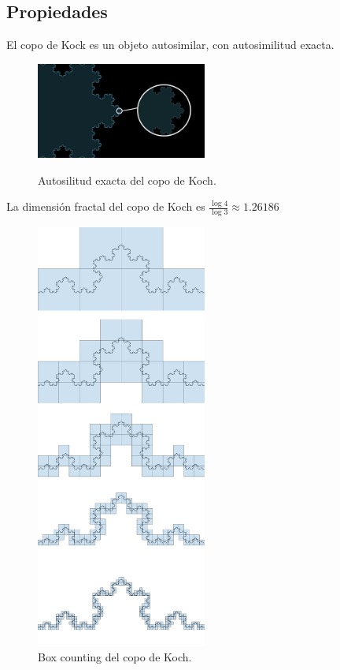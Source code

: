 \subsection{Propiedades}

\noindent El copo de Kock es un objeto autosimilar, con autosimilitud exacta. \cite{youtube-2022}

\begin{figure}[H]
\centering
\includegraphics[width=0.5\textwidth]{figures/kock-snowflake-self-similarity.jpg}
\caption{Autosilitud exacta del copo de Koch.}
\label{fig:koch-snowflake-self-similarity}
\cite{youtube-2022}
\end{figure}

\noindent La dimensión fractal del copo de Koch es $\frac{\log 4}{\log 3} \approx 1.26186$ \cite{eswiki:copo-koch}\\

\begin{figure}[H]
    \centering
    \includegraphics[width=0.5\textwidth]{figures/box-counting-koch-snowflake.png}
    \caption{Box counting del copo de Koch.}
    \label{fig:box-counting-koch-snowflake}
\end{figure}

